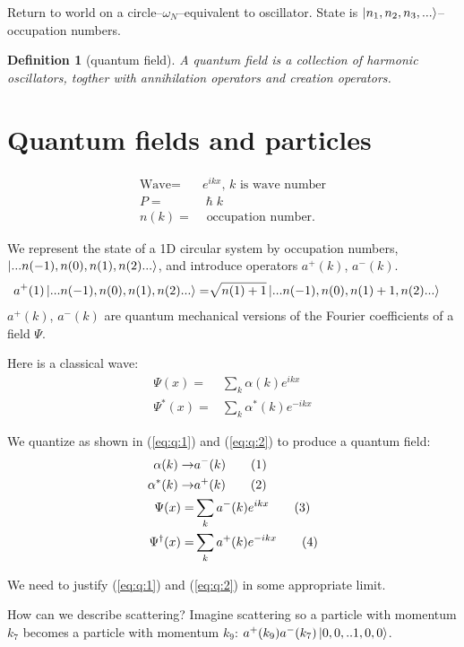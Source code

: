 \documentclass[]{article}
\newcommand\numberthis{\addtocounter{equation}{1}\tag{\theequation}}
\newtheorem{defn}[thm]{Definition}
\begin{document}
Return to world on a circle--$\omega_N$--equivalent to oscillator. State is $\ket{n_1,n_2, n_3,...}$--occupation numbers. 
\begin{defn}[quantum field]
	A quantum field is a collection of harmonic oscillators, togther with annihilation operators and creation operators.
\end{defn}

\section{Quantum fields and particles}



\begin{align*}
\text{Wave} =& e^{i k x} \text{, $k$ is wave number}\\
P=&\hslash k\\
n(k) =& \text{ occupation number.}
\end{align*}

We represent the state of a 1D circular system by occupation numbers, $\ket{...n(-1), n(0), n(1), n(2)...}$, and introduce operators $a^+(k)$, $a^-(k)$. 
\begin{align*}
a^+(1)\ket{...n(-1), n(0), n(1), n(2)...}=& \sqrt{n(1)+1}\ket{...n(-1), n(0), n(1)+1, n(2)...}
\end{align*}
$a^+(k)$, $a^-(k)$ are quantum mechanical versions of the Fourier coefficients of a field $\Psi$.

Here is a classical wave:
\begin{align*}
\Psi(x) =& \sum_k \alpha(k) e^{ikx}\\
\Psi^*(x) =& \sum_k \alpha^*(k) e^{-ikx}
\end{align*}

We quantize as shown in (\ref{eq:q:1}) and (\ref{eq:q:2}) to produce a quantum field:
\begin{align*}
\alpha(k) \rightarrow& a^-(k) \numberthis \label{eq:q:1}\\
\alpha^*(k) \rightarrow& a^+(k) \numberthis \label{eq:q:2}\\
\Psi(x) =& \sum_k a^-(k) e^{ikx} \numberthis \label{eq:Psi}\\
\Psi^\dagger(x) =& \sum_k a^+(k) e^{-ikx} \numberthis \label{eq:Psi:dagger}
\end{align*}

We need to justify (\ref{eq:q:1}) and (\ref{eq:q:2}) in some appropriate limit.

How can we describe scattering? Imagine scattering so a particle with momentum $k_7$ becomes a particle with momentum $k_9$: $a^+(k_9)a^-(k_7)\ket{0,0,..1,0,0}$.
\end{document}

